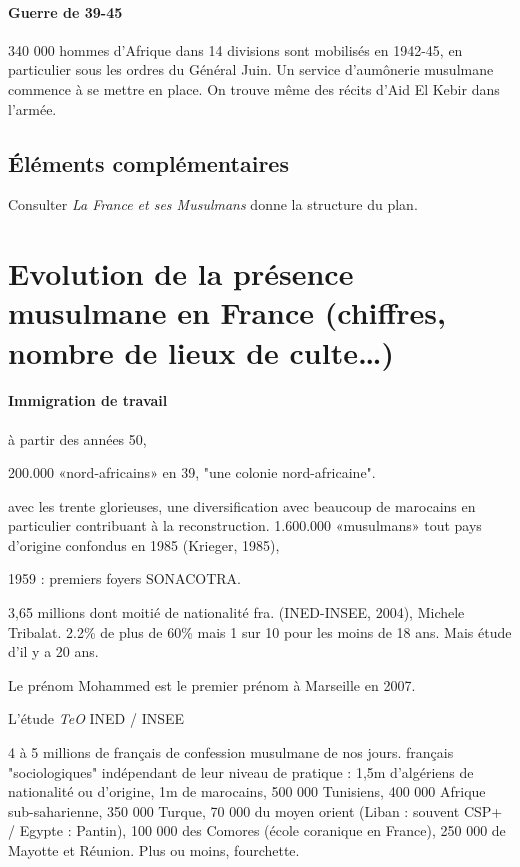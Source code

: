\paragraph{Guerre de 39-45}
340 000 hommes d'Afrique dans 14 divisions sont mobilisés en 1942-45, en particulier sous les ordres du Général Juin. Un service d'aumônerie musulmane commence à se mettre en place. On trouve même des récits d'Aid El Kebir dans l'armée. 

\subsection{Éléments complémentaires}

Consulter \emph{La France et ses Musulmans} donne la structure du plan.

\section{Evolution de la présence musulmane en France (chiffres, nombre de lieux de
culte…)}

\paragraph{Immigration de travail}
à partir des années 50, 
\bi
\item 200.000 «nord-africains» en 39, "une colonie nord-africaine". 
\item avec les trente glorieuses, une diversification avec beaucoup de marocains en particulier contribuant à la reconstruction. 1.600.000 «musulmans» tout pays d’origine confondus en 1985 (Krieger, 1985),
\item 1959 : premiers foyers SONACOTRA. 
\item 3,65 millions dont moitié de nationalité fra. (INED-INSEE, 2004), Michele Tribalat.  2.2\% de plus de 60\% mais 1 sur 10 pour les moins de 18 ans. Mais étude d'il y a 20 ans. 
\item Le prénom Mohammed est le premier prénom à Marseille en 2007.
\item L'étude \emph{TeO} INED / INSEE 
\item 4 à 5 millions de français de confession musulmane de nos jours. français "sociologiques" indépendant de leur niveau de pratique : 1,5m d'algériens de nationalité ou d'origine, 1m de marocains, 500 000 Tunisiens, 400 000 Afrique sub-saharienne, 350 000 Turque, 70 000 du moyen orient (Liban : souvent CSP+ / Egypte : Pantin), 100 000 des Comores (école coranique en France), 250 000 de Mayotte et Réunion. Plus ou moins, fourchette. 
\ei

